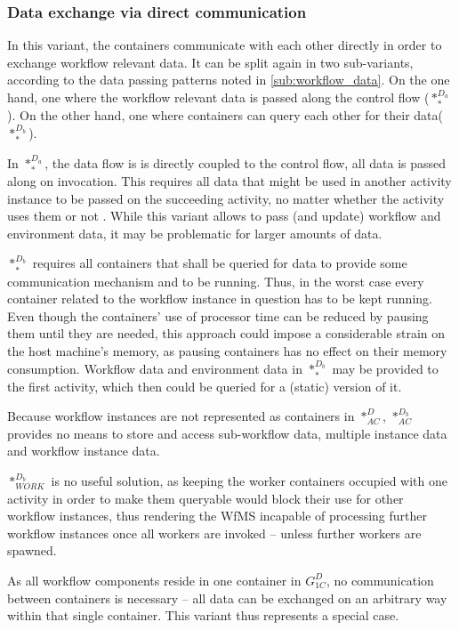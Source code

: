   \subsubsection{Data exchange via direct communication} %
  \label{ssub:data_exchange_via_direct_communication}
    In this variant, the containers communicate with each other directly in order to exchange workflow relevant data. It can be split again in two sub-variants, according to the data passing patterns noted in \ref{sub:workflow_data}. On the one hand, one where the workflow relevant data is passed along the control flow ($*_{*}^{D_a}$). On the other hand, one where containers can query each other for their data($*_{*}^{D_b}$).

    In $*_{*}^{D_a}$, the data flow is is directly coupled to the control flow, \ie all data is passed along on invocation. This requires all data that might be used in another activity instance to be passed on the succeeding activity, no matter whether the activity uses them or not \cite{Russell2005Workflow}. While this variant allows to pass (and update) workflow and environment data, it may be problematic for larger amounts of data.

    $*_{*}^{D_b}$ requires all containers that shall be queried for data to provide some communication mechanism and to be running. Thus, in the worst case every container related to the workflow instance in question has to be kept running. Even though the containers' use of processor time can be reduced by pausing them until they are needed, this approach could impose a considerable strain on the host machine's memory, as pausing containers has no effect on their memory consumption.
    Workflow data and environment data in $*_{*}^{D_b}$ may be provided to the first activity, which then could be queried for a (static) version of it.

    Because workflow instances are not represented as containers in $*_{AC}^{D}$, $*_{AC}^{D_b}$ provides no means to store and access sub-workflow data, multiple instance data and workflow instance data.

    $*_{WORK}^{D_b}$ is no useful solution, as keeping the worker containers occupied with one activity in order to make them queryable would block their use for other workflow instances, thus rendering the \ac{WfMS} incapable of processing further workflow instances once all workers are invoked -- unless further workers are spawned.

    As all workflow components reside in one container in $G_{1C}^{D}$, no communication between containers is necessary -- all data can be exchanged on an arbitrary way within that single container. This variant thus represents a special case.

